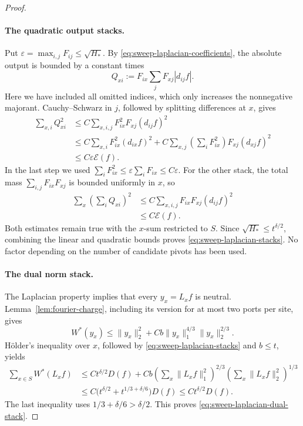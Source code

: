 \begin{proof}
\paragraph{The quadratic output stacks.}
Put \(\varepsilon=\max_{i,j}F_{ij}\le\sqrt{H_*}\).
By \eqref{eq:sweep-laplacian-coefficients}, the absolute output is bounded
by a constant times
\[
 Q_{xi}:=F_{ix}\sum_jF_{xj}|d_{ij}f|.
\]
Here we have included all omitted indices, which only increases the
nonnegative majorant.  Cauchy--Schwarz in \(j\), followed by splitting
differences at \(x\), gives
\begin{align*}
 \sum_{x,i}Q_{xi}^2
 &\le C\sum_{x,i,j}F_{ix}^2F_{xj}(d_{ij}f)^2\\
 &\le C\sum_{x,i}F_{ix}^2(d_{ix}f)^2
   +C\sum_{x,j}\left(\sum_iF_{ix}^2\right)
                       F_{xj}(d_{xj}f)^2\\
 &\le C\varepsilon\mathcal E(f).
\end{align*}
In the last step we used
\(\sum_iF_{ix}^2\le\varepsilon\sum_iF_{ix}\le C\varepsilon\).
For the other stack, the total mass
\(\sum_{i,j}F_{ix}F_{xj}\) is bounded uniformly in \(x\), so
\begin{align*}
 \sum_x\left(\sum_iQ_{xi}\right)^2
 &\le C\sum_{x,i,j}F_{ix}F_{xj}(d_{ij}f)^2\\
 &\le C\mathcal E(f).
\end{align*}
Both estimates remain true with the \(x\)-sum restricted to \(S\).
Since \(\sqrt{H_*}\le t^{\delta/2}\), combining the linear and
quadratic bounds proves \eqref{eq:sweep-laplacian-stacks}.
No factor depending on the number of candidate pivots has been used.

\paragraph{The dual norm stack.}
The Laplacian property implies that every \(y_x=L_xf\) is neutral.
Lemma~\ref{lem:fourier-charge}, including its version for at most two
ports per site, gives
\[
 W^*(y_x)\le\|y_x\|_2^2
      +Cb\|y_x\|_1^{4/3}\|y_x\|_2^{2/3}.
\]
Hölder's inequality over \(x\), followed by
\eqref{eq:sweep-laplacian-stacks} and \(b\le t\), yields
\begin{align*}
 \sum_{x\in S}W^*(L_xf)
 &\le Ct^{\delta/2}D(f)
   +Cb\left(\sum_x\|L_xf\|_1^2\right)^{2/3}
       \left(\sum_x\|L_xf\|_2^2\right)^{1/3}\\
 &\le C\bigl(t^{\delta/2}+t^{1/3+\delta/6}\bigr)D(f)
 \le Ct^{\delta/2}D(f).
\end{align*}
The last inequality uses \(1/3+\delta/6>\delta/2\).
This proves \eqref{eq:sweep-laplacian-dual-stack}.
\end{proof}


